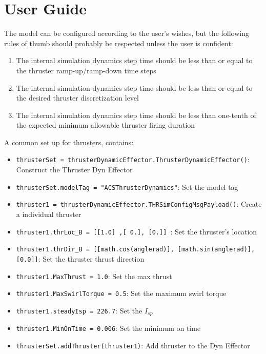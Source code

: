 \section{User Guide}

The model can be configured according to the user's wishes, but the following
rules of thumb should probably be respected unless the user is confident:
\begin{enumerate}
\item{The internal simulation dynamics step time should be less than or equal
     to the thruster ramp-up/ramp-down time steps}
\item{The internal simulation dynamics step time should be less than or equal to
     the desired thruster discretization level}
\item{The internal simulation dynamics step time should be less than one-tenth
    of the expected minimum allowable thruster firing duration}
\end{enumerate}

A common set up for thrusters, contains:

\begin{itemize}
  \item[-]      \texttt{thrusterSet = thrusterDynamicEffector.ThrusterDynamicEffector()}: Construct the Thruster Dyn Effector
  \item[-]   \texttt{thrusterSet.modelTag = "ACSThrusterDynamics"}: Set the model tag
  \item[-]   \texttt{thruster1 = thrusterDynamicEffector.THRSimConfigMsgPayload()}: Create a individual thruster
  \item[-]   \texttt{thruster1.thrLoc\_B = [[1.0] ,[ 0.], [0.]] }: Set the thruster's location
  \item[-]   \texttt{thruster1.thrDir\_B = [[math.cos(anglerad)], [math.sin(anglerad)], [0.0]]}: Set the thruster thrust direction
  \item[-]   \texttt{thruster1.MaxThrust = 1.0}: Set the max thrust
  \item[-]   \texttt{thruster1.MaxSwirlTorque = 0.5}: Set the maximum swirl torque
  \item[-]   \texttt{thruster1.steadyIsp = 226.7}: Set the $I_{sp}$
  \item[-]   \texttt{thruster1.MinOnTime = 0.006}: Set the minimum on time
  \item[-]   \texttt{thrusterSet.addThruster(thruster1)}: Add thruster to the Dyn Effector
\end{itemize}

